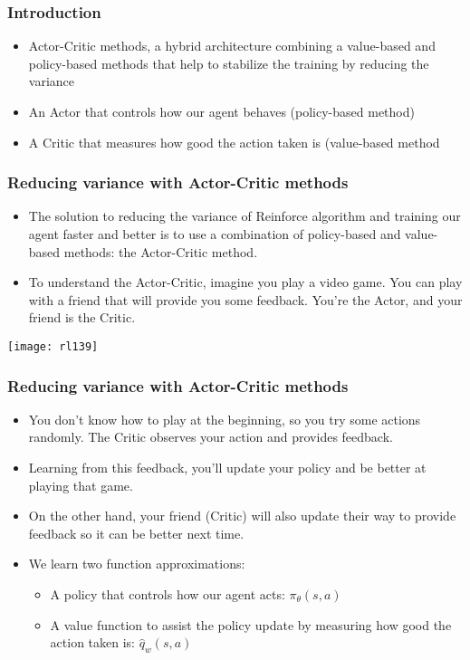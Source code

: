 \begin{frame}[fragile]\frametitle{Introduction}


\begin{itemize}
\item Actor-Critic methods, a hybrid architecture combining a value-based and policy-based methods that help to stabilize the training by reducing the variance
\item An Actor that controls how our agent behaves (policy-based method)
\item A Critic that measures how good the action taken is (value-based method
\end{itemize}


\end{frame}

\begin{frame}[fragile]\frametitle{Reducing variance with Actor-Critic methods}


\begin{itemize}
\item The solution to reducing the variance of Reinforce algorithm and training our agent faster and better is to use a combination of policy-based and value-based methods: the Actor-Critic method.
\item 
To understand the Actor-Critic, imagine you play a video game. You can play with a friend that will provide you some feedback. You’re the Actor, and your friend is the Critic.
\end{itemize}

\begin{center}
\texttt{[image: rl139]}
\end{center}

\end{frame}

\begin{frame}[fragile]\frametitle{Reducing variance with Actor-Critic methods}
\begin{itemize}
\item You don’t know how to play at the beginning, so you try some actions randomly. The Critic observes your action and provides feedback.
\item Learning from this feedback, you’ll update your policy and be better at playing that game.
\item On the other hand, your friend (Critic) will also update their way to provide feedback so it can be better next time.
\item We learn two function approximations:
\begin{itemize}
\item A policy that controls how our agent acts: $\pi_{\theta}(s,a)$
\item A value function to assist the policy update by measuring how good the action taken is: $\hat{q}_{w}(s,a)$
\end{itemize}
\end{itemize}
\end{frame}

